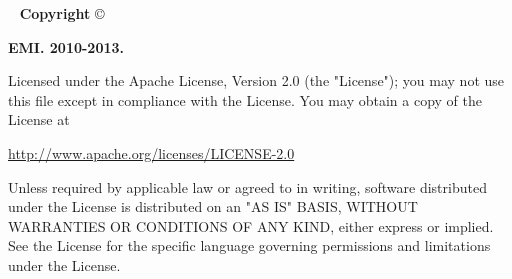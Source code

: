 %
~
\vfill{}
{\bf Copyright} \copyright\ {\bf EMI. 2010-2013.

Licensed under the Apache License, Version 2.0 (the "License"); you may not use
this file except in compliance with the License.  You may obtain a copy of the
License at 

\begin{center}
\href{http://www.apache.org/licenses/LICENSE-2.0}{http://www.apache.org/licenses/LICENSE-2.0}
\end{center}

Unless required by applicable law or agreed to in writing, software distributed
under the License is distributed on an "AS IS" BASIS, WITHOUT WARRANTIES OR
CONDITIONS OF ANY KIND, either express or implied.  See the License for the
specific language governing permissions and limitations under the License.
}
\clearpage
